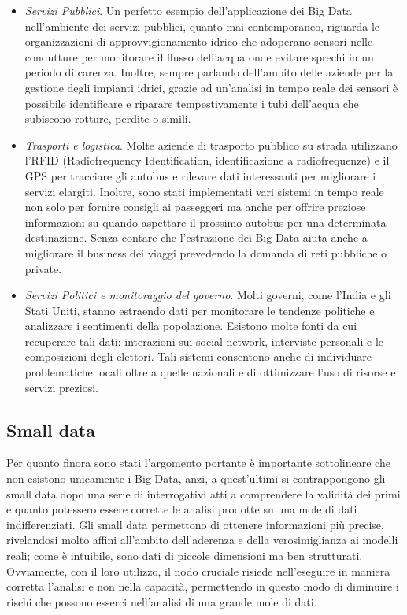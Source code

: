 \begin{itemize}
    \item \textit{Servizi Pubblici}. Un perfetto esempio dell’applicazione dei Big Data nell’ambiente dei servizi pubblici, quanto mai contemporaneo, riguarda le organizzazioni di approvvigionamento idrico che adoperano sensori nelle condutture per monitorare il flusso dell’acqua onde evitare sprechi in un periodo di carenza. Inoltre, sempre parlando dell’ambito delle aziende per la gestione degli impianti idrici, grazie ad un’analisi in tempo reale dei sensori è possibile identificare e riparare tempestivamente i tubi dell’acqua che subiscono rotture, perdite o simili.  
    \item \textit{Trasporti e logistica}. Molte aziende di trasporto pubblico su strada utilizzano l’RFID (Radiofrequency Identification, identificazione a radiofrequenze) e il GPS per tracciare gli autobus e rilevare dati interessanti per migliorare i servizi elargiti. Inoltre, sono stati implementati vari sistemi in tempo reale non solo per fornire consigli ai passeggeri ma anche per offrire preziose informazioni su quando aspettare il prossimo autobus per una determinata destinazione. Senza contare che l’estrazione dei Big Data aiuta anche a migliorare il business dei viaggi prevedendo la domanda di reti pubbliche o private.
    \item \textit{Servizi Politici e monitoraggio del governo}. Molti governi, come l’India e gli Stati Uniti, stanno estraendo dati per monitorare le tendenze politiche e analizzare i sentimenti della popolazione. Esistono molte fonti da cui recuperare tali dati: interazioni sui social network, interviste personali e le composizioni degli elettori. Tali sistemi consentono anche di individuare problematiche locali oltre a quelle nazionali e di ottimizzare l’uso di risorse e servizi preziosi.
\end{itemize}

\subsection{Small data}

Per quanto finora sono stati l’argomento portante è importante sottolineare che non esistono unicamente i Big Data, anzi, a quest’ultimi si contrappongono gli small data dopo una serie di interrogativi atti a comprendere la validità dei primi e quanto potessero essere corrette le analisi prodotte su una mole di dati indifferenziati. Gli small data permettono di ottenere informazioni più precise, rivelandosi molto affini all’ambito dell’aderenza e della verosimiglianza ai modelli reali; come è intuibile, sono dati di piccole dimensioni ma ben strutturati. Ovviamente, con il loro utilizzo, il nodo cruciale risiede nell’eseguire in maniera corretta l’analisi e non nella capacità, permettendo in questo modo di diminuire i rischi che possono esserci nell’analisi di una grande mole di dati.\cite{selcoerp_small_data}


